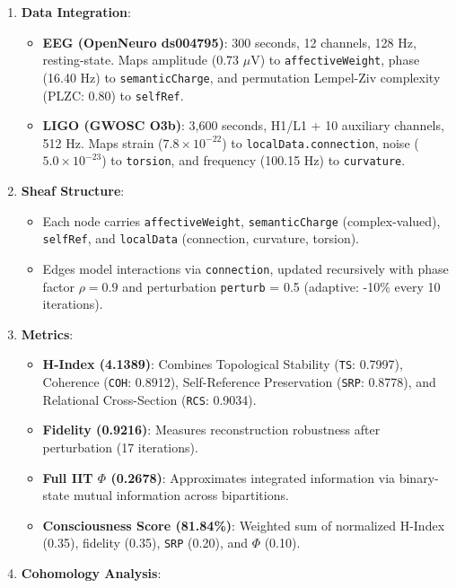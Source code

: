 \documentclass[12pt]{article}
\begin{document}
\begin{enumerate}
    \item \textbf{Data Integration}:
    \begin{itemize}
        \item \textbf{EEG (OpenNeuro ds004795)}: 300 seconds, 12 channels, 128 Hz, resting-state. Maps amplitude (0.73 $\mu$V) to \texttt{affectiveWeight}, phase (16.40 Hz) to \texttt{semanticCharge}, and permutation Lempel-Ziv complexity (PLZC: 0.80) to \texttt{selfRef}.
        \item \textbf{LIGO (GWOSC O3b)}: 3,600 seconds, H1/L1 + 10 auxiliary channels, 512 Hz. Maps strain ($7.8 \times 10^{-22}$) to \texttt{localData.connection}, noise ($5.0 \times 10^{-23}$) to \texttt{torsion}, and frequency (100.15 Hz) to \texttt{curvature}.
    \end{itemize}
    \item \textbf{Sheaf Structure}:
    \begin{itemize}
        \item Each node carries \texttt{affectiveWeight}, \texttt{semanticCharge} (complex-valued), \texttt{selfRef}, and \texttt{localData} (connection, curvature, torsion).
        \item Edges model interactions via \texttt{connection}, updated recursively with phase factor $\rho = 0.9$ and perturbation \texttt{perturb} = 0.5 (adaptive: -10\% every 10 iterations).
    \end{itemize}
    \item \textbf{Metrics}:
    \begin{itemize}
        \item \textbf{H-Index (4.1389)}: Combines Topological Stability (\texttt{TS}: 0.7997), Coherence (\texttt{COH}: 0.8912), Self-Reference Preservation (\texttt{SRP}: 0.8778), and Relational Cross-Section (\texttt{RCS}: 0.9034).
        \item \textbf{Fidelity (0.9216)}: Measures reconstruction robustness after perturbation (17 iterations).
        \item \textbf{Full IIT $\Phi$ (0.2678)}: Approximates integrated information via binary-state mutual information across bipartitions.
        \item \textbf{Consciousness Score (81.84\%)}: Weighted sum of normalized H-Index (0.35), fidelity (0.35), \texttt{SRP} (0.20), and $\Phi$ (0.10).
    \end{itemize}
    \item \textbf{Cohomology Analysis}:
    \begin{itemize}

\end{itemize}
\end{enumerate}
\end{document}
